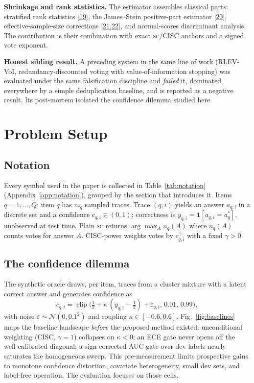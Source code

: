 \documentclass[conference]{IEEEtran}
\newcommand{\SC}{\textsc{sc}}
\begin{document}
\textbf{Shrinkage and rank statistics.} The estimator assembles classical parts: stratified rank statistics [\hyperlink{bib:vanelteren1960}{19}], the James--Stein positive-part estimator [\hyperlink{bib:james1961estimation}{20}], effective-sample-size corrections [\hyperlink{bib:kish1965}{21},\hyperlink{bib:rao1981analysis}{22}], and normal-scores discriminant analysis. The contribution is their combination with exact \SC{}/CISC anchors and a signed vote exponent.

\textbf{Honest sibling result.} A preceding system in the same line of work
(RLEV-VoI, redundancy-discounted voting with value-of-information stopping)
was evaluated under the same falsification discipline and \emph{failed} it,
dominated everywhere by a simple deduplication baseline, and is reported as a
negative result. Its post-mortem isolated the confidence dilemma studied
here.%


\section{Problem Setup}\label{sec:setup}

\subsection{Notation}
Every symbol used in the paper is collected in Table~\ref{tab:notation} (Appendix~\ref{app:notation}), grouped by the section that introduces it.
Items $q=1,\dots,Q$; item $q$ has $m_q$ sampled traces. Trace $(q,i)$ yields an answer $a_{q,i}$ in a discrete set and a confidence $c_{q,i}\in(0,1)$; correctness is $y_{q,i}=\mathbf{1}[a_{q,i}=a_q^\ast]$, unobserved at test time. Plain \SC{} returns $\arg\max_A n_q(A)$ where $n_q(A)$ counts votes for answer $A$. CISC-power weights votes by $c_{q,i}^{\,\gamma}$ with a fixed $\gamma>0$.

\subsection{The confidence dilemma}
The synthetic oracle draws, per item, traces from a cluster mixture with a latent correct answer and generates confidence as
\hypertarget{eq:confmodel}{\,}
\begin{equation}
c_{q,i}=\operatorname{clip}\!\big(\tfrac12+\kappa\,(y_{q,i}-\tfrac12)+\varepsilon_{q,i},\,0.01,\,0.99\big),
\end{equation}
with noise $\varepsilon\sim\mathcal{N}(0,0.1^2)$ and coupling $\kappa\in[-0.6,0.6]$. Fig.~\ref{fig:baselines} maps the baseline landscape \emph{before} the proposed method existed: unconditional weighting (CISC, $\gamma=1$) collapses on $\kappa<0$; an ECE gate never opens off the well-calibrated diagonal; a sign-corrected AUC gate over dev labels nearly saturates the homogeneous sweep. This pre-measurement limits prospective gains to monotone confidence distortion, covariate heterogeneity, small dev sets, and label-free operation. The evaluation focuses on those cells.
\end{document}
